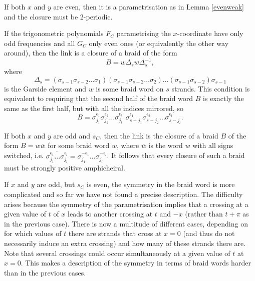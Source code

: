 \documentclass[notitlepage,12pt]{revtex4-1}
\begin{document}
If both $x$ and $y$ are even, then it is a parametrisation as in Lemma \ref{evenweak} and the closure must be 2-periodic. 

If the trigonometric polynomials $F_{C}$ parametrising the $x$-coordinate have only odd frequencies and all $G_{C}$ only even ones (or equivalently the other way around), then the link is a closure of a braid of the form 
\begin{equation}
B=w\Delta_{s}w\Delta^{-1}_{s},
\end{equation} 
where 
\begin{equation}\Delta_{s}=(\sigma_{s-1}\sigma_{s-2}\ldots \sigma_{1})(\sigma_{s-1}\sigma_{s-2}\ldots\sigma_{2})\ldots(\sigma_{s-1}\sigma_{s-2})\sigma_{s-1}
\end{equation} 
is the Garside element and $w$ is some braid word on $s$ strands. This condition is equivalent to requiring that the second half of the braid word $B$ is exactly the same as the first half, but with all the indices mirrored, so \begin{equation}B=\sigma_{j_{1}}^{\epsilon_{1}}\sigma_{j_{2}}^{\epsilon_{2}}\ldots\sigma_{j_{l}}^{\epsilon_{l}}\ \ \sigma_{s-j_{1}}^{\epsilon_{1}}\sigma_{s-j_{2}}^{\epsilon_{2}}\ldots\sigma_{s-j_{l}}^{\epsilon_{l}}.
\end{equation}

If both $x$ and $y$ are odd and $s_{C}$, then the link is the closure of a braid $B$ of the form $B=w\overline{w}$ for some braid word $w$, where $\overline{w}$ is the word $w$ with all signs switched, i.e. $\overline{\sigma_{j_{1}}^{\epsilon_{1}}\ldots\sigma_{j_{l}}^{\epsilon_{l}}}=\sigma_{j_{1}}^{-\epsilon_{1}}\ldots\sigma_{j_{l}}^{-\epsilon_{l}}$.
It follows that every closure of such a braid must be strongly positive amphicheiral.

If $x$ and $y$ are odd, but $s_{C}$ is even, the symmetry in the braid word is more complicated and so far we have not found a precise description. The difficulty arises because the symmetry of the parametrisation implies that a crossing at a given value of $t$ of $x$ leads to another crossing at $t$ and $-x$ (rather than $t+\pi$ as in the previous case). There is now a multitude of different cases, depending on for which values of $t$ there are strands that cross at $x=0$ (and thus do not necessarily induce an extra crossing) and how many of these strands there are. Note that several crossings could occur simultaneously at a given value of $t$ at $x=0$. This makes a description of the symmetry in terms of braid words harder than in the previous cases.
\end{document}
